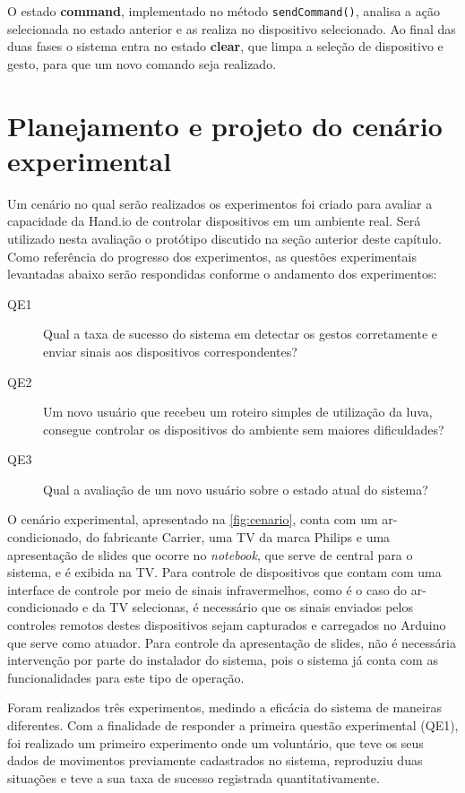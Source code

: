 O estado \textbf{command}, implementado no método \texttt{sendCommand()}, analisa a ação selecionada no estado anterior e as realiza no dispositivo selecionado. Ao final das duas fases o sistema entra no estado \textbf{clear}, que limpa a seleção de dispositivo e gesto, para que um novo comando seja realizado. 

\section{Planejamento e projeto do cenário experimental}


Um cenário no qual serão realizados os experimentos foi criado para avaliar a capacidade da Hand.io de controlar dispositivos em um ambiente real. Será utilizado nesta avaliação o protótipo discutido na seção anterior deste capítulo. Como referência do progresso dos experimentos, as questões experimentais levantadas abaixo serão respondidas conforme o andamento dos experimentos:

\begin{description}
    \item [QE1] \label{qa:1} Qual a taxa de sucesso do sistema em detectar os gestos corretamente e enviar sinais aos dispositivos correspondentes?
    \item [QE2] \label{qa:2} Um novo usuário que recebeu um roteiro simples de utilização da luva, consegue controlar os dispositivos do ambiente sem maiores dificuldades?
    \item [QE3] \label{qa:3} Qual a avaliação de um novo usuário sobre o estado atual do sistema?
\end{description}

O cenário experimental, apresentado na \autoref{fig:cenario}, conta com um ar-condicionado, do fabricante Carrier, uma TV da marca Philips e uma apresentação de slides que ocorre no \textit{notebook}, que serve de central para o sistema, e é exibida na TV. Para controle de dispositivos que contam com uma interface de controle por meio de sinais infravermelhos, como é o caso do ar-condicionado e da TV selecionas, é necessário que os sinais enviados pelos controles remotos destes dispositivos sejam capturados e carregados no Arduino que serve como atuador. Para controle da apresentação de slides, não é necessária intervenção por parte do instalador do sistema, pois o sistema já conta com as funcionalidades para este tipo de operação.

Foram realizados três experimentos, medindo a eficácia do sistema de maneiras diferentes. Com a finalidade de responder a primeira questão experimental (QE1), foi realizado um primeiro experimento onde um voluntário, que teve os seus dados de movimentos previamente cadastrados no sistema, reproduziu duas situações e teve a sua taxa de sucesso registrada quantitativamente.

